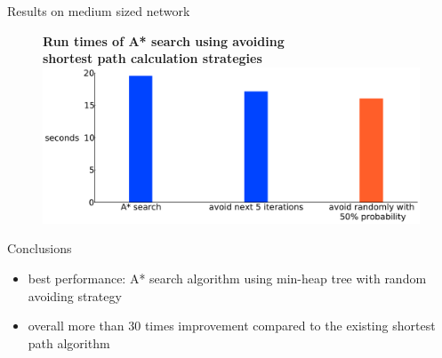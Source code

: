 \documentclass[final]{beamer}
\begin{document}
\begin{frame}{ }
\begin{columns}[t]
\begin{column}{.26\linewidth}
\begin{block}{Results on medium sized network}
\begin{figure}
                    {\bfseries \qquad Run times of A* search using avoiding\\ \qquad shortest path calculation strategies}
                    \includegraphics[width=\linewidth]{img/random_runtime}
                \end{figure}
            \end{block}
            \begin{block}{Conclusions}
                \begin{itemize}
                    \itemsep.5em
                    \item \alert{best performance}: A* search algorithm using min-heap tree with random avoiding strategy
                    \item overall more than \alert{30 times improvement} compared to the existing shortest path algorithm
                \end{itemize}
            \end{block}
        \end{column}
    \end{columns}
\end{frame}
\end{document}
